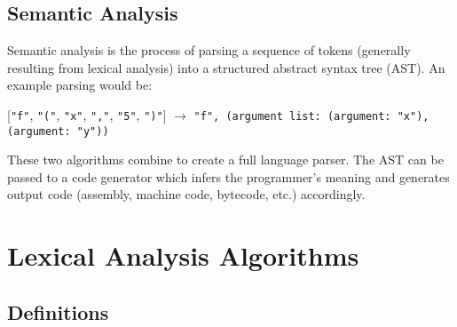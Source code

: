 \documentclass[10pt,a4paper]{article}
\begin{document}
\subsection{Semantic Analysis}
Semantic analysis is the process of parsing a sequence of tokens (generally resulting from lexical analysis) into a structured abstract syntax tree (AST). An example parsing would be:\newline

[\verb|"f"|, \verb|"("|, \verb|"x"|, \verb|","|, \verb|"5"|, \verb|")"|] $\rightarrow$ \verb|"f", (argument list: (argument: "x"), (argument: "y"))|\newline

These two algorithms combine to create a full language parser. The AST can be passed to a code generator which infers the programmer's meaning and generates output code (assembly, machine code, bytecode, etc.) accordingly. 

\section{Lexical Analysis Algorithms}

\subsection{Definitions}
\end{document}
